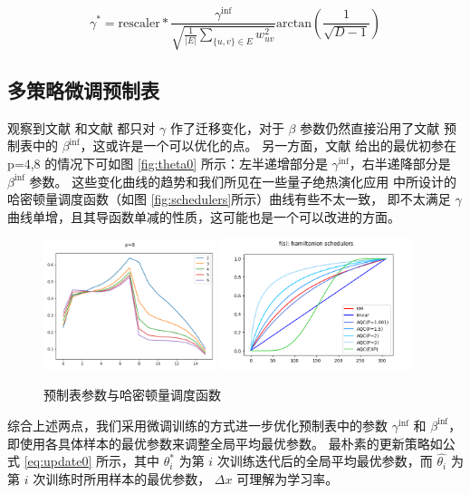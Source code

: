 \documentclass[withoutpreface,bwprint]{cumcmthesis}
\begin{document}
\begin{equation}
\gamma^\ast = \mathrm{rescaler} * \frac{\gamma^{\mathrm{inf}}}{\sqrt{\frac{1}{|E|} \sum_{\{u,v\} \in E} w_{uv}^2}} \mathrm{arctan}(\frac{1}{\sqrt{D-1}})
\label{eq:gamma-ours}
\end{equation}

\subsection{多策略微调预制表}

观察到文献 \cite{Shaydulin2023} 和文献 \cite{Sureshbabu2024} 都只对 $ \gamma $ 作了迁移变化，对于 $ \beta $ 参数仍然直接沿用了文献 \cite{Basso2022} 预制表中的 $ \beta^\mathrm{inf} $，这或许是一个可以优化的点。
另一方面，文献 \cite{Basso2022} 给出的最优初参在 p=4,8 的情况下可如图 \ref{fig:theta0} 所示：左半递增部分是 $ \gamma^\mathrm{inf} $，右半递降部分是 $ \beta^\mathrm{inf} $ 参数。
这些变化曲线的趋势和我们所见在一些量子绝热演化应用 \cite{An2022} 中所设计的哈密顿量调度函数（如图 \ref{fig:schedulers}所示）曲线有些不太一致，
即不太满足 $ \gamma $ 曲线单增，且其导函数单减的性质，这可能也是一个可以改进的方面。

\begin{figure}
	\centering
	{\includegraphics[width=0.45\textwidth]{figures/original_p=8.png}}
	{\includegraphics[width=0.5\textwidth]{figures/schedulers.png}}
	\caption{预制表参数与哈密顿量调度函数}
\end{figure}

综合上述两点，我们采用微调训练的方式进一步优化预制表中的参数 $ \gamma^\mathrm{inf} $ 和 $ \beta^\mathrm{inf} $，即使用各具体样本的最优参数来调整全局平均最优参数。
最朴素的更新策略如公式 \ref{eq:update0} 所示，其中 $ \theta_i^\ast $ 为第 $ i $ 次训练迭代后的全局平均最优参数，而 $ \hat{\theta_i} $ 为第 $ i $ 次训练时所用样本的最优参数， $ \Delta x $ 可理解为学习率。
\end{document}
